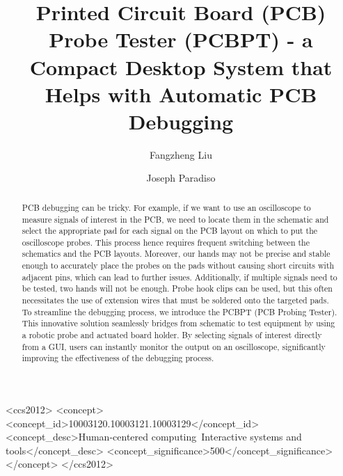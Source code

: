\documentclass[sigconf]{acmart}
\begin{document}
\title[Printed Circuit Board (PCB) Probe Tester (PCBPT) - a Compact Desktop System that Helps with \\ Automatic PCB Debugging]
{Printed Circuit Board (PCB) Probe Tester (PCBPT) - a Compact Desktop System that Helps with Automatic PCB Debugging}

\author{Fangzheng Liu}

\author{Joseph Paradiso}

\begin{abstract}
PCB debugging can be tricky. For example, if we want to use an oscilloscope to measure signals of interest in the PCB, we need to locate them in the schematic and select the appropriate pad for each signal on the PCB layout on which to put the oscilloscope probes. This process hence requires frequent switching between the schematics and the PCB layouts. Moreover, our hands may not be precise and stable enough to accurately place the probes on the pads without causing short circuits with adjacent pins, which can lead to further issues. Additionally, if multiple signals need to be tested, two hands will not be enough. Probe hook clips can be used, but this often necessitates the use of extension wires that must be soldered onto the targeted pads. To streamline the debugging process, we introduce the PCBPT (PCB Probing Tester). This innovative solution seamlessly bridges from schematic to test equipment by using a robotic probe and actuated board holder. By selecting signals of interest directly from a GUI, users can instantly monitor the output on an oscilloscope, significantly improving the effectiveness of the debugging process.
\end{abstract}

\begin{CCSXML}
<ccs2012>
   <concept>
       <concept_id>10003120.10003121.10003129</concept_id>
       <concept_desc>Human-centered computing~Interactive systems and tools</concept_desc>
       <concept_significance>500</concept_significance>
       </concept>
 </ccs2012>
\end{CCSXML}
\end{document}
